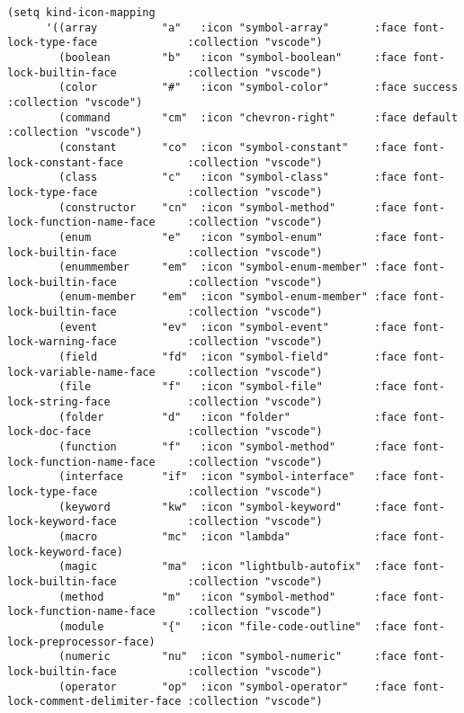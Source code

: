 \documentclass[11pt]{article}
\begin{document}
\begin{verbatim}
(setq kind-icon-mapping
      '((array          "a"   :icon "symbol-array"       :face font-lock-type-face              :collection "vscode")
        (boolean        "b"   :icon "symbol-boolean"     :face font-lock-builtin-face           :collection "vscode")
        (color          "#"   :icon "symbol-color"       :face success                          :collection "vscode")
        (command        "cm"  :icon "chevron-right"      :face default                          :collection "vscode")
        (constant       "co"  :icon "symbol-constant"    :face font-lock-constant-face          :collection "vscode")
        (class          "c"   :icon "symbol-class"       :face font-lock-type-face              :collection "vscode")
        (constructor    "cn"  :icon "symbol-method"      :face font-lock-function-name-face     :collection "vscode")
        (enum           "e"   :icon "symbol-enum"        :face font-lock-builtin-face           :collection "vscode")
        (enummember     "em"  :icon "symbol-enum-member" :face font-lock-builtin-face           :collection "vscode")
        (enum-member    "em"  :icon "symbol-enum-member" :face font-lock-builtin-face           :collection "vscode")
        (event          "ev"  :icon "symbol-event"       :face font-lock-warning-face           :collection "vscode")
        (field          "fd"  :icon "symbol-field"       :face font-lock-variable-name-face     :collection "vscode")
        (file           "f"   :icon "symbol-file"        :face font-lock-string-face            :collection "vscode")
        (folder         "d"   :icon "folder"             :face font-lock-doc-face               :collection "vscode")
        (function       "f"   :icon "symbol-method"      :face font-lock-function-name-face     :collection "vscode")
        (interface      "if"  :icon "symbol-interface"   :face font-lock-type-face              :collection "vscode")
        (keyword        "kw"  :icon "symbol-keyword"     :face font-lock-keyword-face           :collection "vscode")
        (macro          "mc"  :icon "lambda"             :face font-lock-keyword-face)
        (magic          "ma"  :icon "lightbulb-autofix"  :face font-lock-builtin-face           :collection "vscode")
        (method         "m"   :icon "symbol-method"      :face font-lock-function-name-face     :collection "vscode")
        (module         "{"   :icon "file-code-outline"  :face font-lock-preprocessor-face)
        (numeric        "nu"  :icon "symbol-numeric"     :face font-lock-builtin-face           :collection "vscode")
        (operator       "op"  :icon "symbol-operator"    :face font-lock-comment-delimiter-face :collection "vscode")

\end{verbatim}
\end{document}
